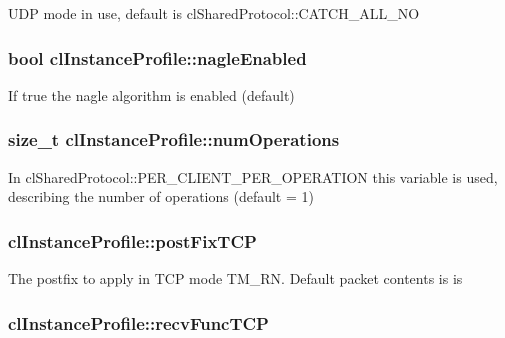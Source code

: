 \label{classcl_instance_profile_a5ca5a16aac3d34666029cc91d9a87657}
UDP mode in use, default is clSharedProtocol::CATCH\_\-ALL\_\-NO \hypertarget{classcl_instance_profile_a5618aef6c4f569e498446b398c60dc12}{
\subsubsection[{nagleEnabled}]{\setlength{\rightskip}{0pt plus 5cm}bool {\bf clInstanceProfile::nagleEnabled}}}
\label{classcl_instance_profile_a5618aef6c4f569e498446b398c60dc12}
If true the nagle algorithm is enabled (default) \hypertarget{classcl_instance_profile_ac223cf65d4308e8f5c58472503e2ccab}{
\subsubsection[{numOperations}]{\setlength{\rightskip}{0pt plus 5cm}size\_\-t {\bf clInstanceProfile::numOperations}}}
\label{classcl_instance_profile_ac223cf65d4308e8f5c58472503e2ccab}
In clSharedProtocol::PER\_\-CLIENT\_\-PER\_\-OPERATION this variable is used, describing the number of operations (default = 1) \hypertarget{classcl_instance_profile_a128c796dc4336367dbe442f8347236da}{
\subsubsection[{postFixTCP}]{ {\bf clInstanceProfile::postFixTCP}}}
\label{classcl_instance_profile_a128c796dc4336367dbe442f8347236da}
The postfix to apply in TCP mode TM\_\-RN. Default packet contents is is \par
 \hypertarget{classcl_instance_profile_a5256ee272d945f53112a34b5c18136fa}{
\subsubsection[{recvFuncTCP}]{ {\bf clInstanceProfile::recvFuncTCP}}}
